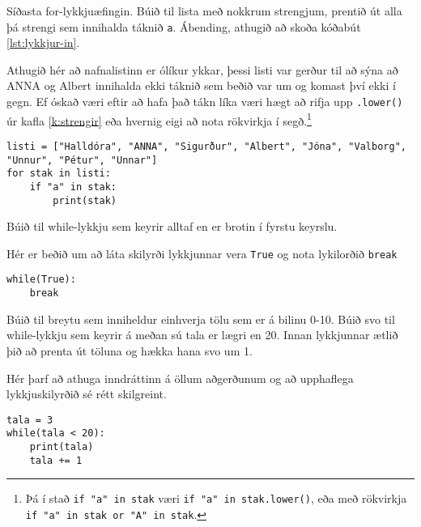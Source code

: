 \begin{exercise}\label{lyk5}
Síðasta for-lykkjuæfingin.
Búið til lista með nokkrum strengjum, prentið út alla þá strengi sem innihalda táknið \texttt{a}.
Ábending, athugið að skoða kóðabút \ref{lst:lykkjur-in}.
\end{exercise}
\begin{Answer}[ref={lyk5}]
Athugið hér að nafnalistinn er ólíkur ykkar, þessi listi var gerður til að sýna að ANNA og Albert innihalda ekki táknið sem beðið var um og komast því ekki í gegn.
Ef óskað væri eftir að hafa það tákn líka væri hægt að rifja upp \texttt{.lower()} úr kafla \ref{k:strengir} eða hvernig eigi að nota rökvirkja í segð.\footnote{Þá í stað \texttt{if "a" in stak} væri \texttt{if "a" in stak.lower()}, eða með rökvirkja \texttt{if "a" in stak or "A" in stak}.}
	
\begin{lstlisting}
listi = ["Halldóra", "ANNA", "Sigurður", "Albert", "Jóna", "Valborg", "Unnur", "Pétur", "Unnar"]
for stak in listi:
	if "a" in stak:
		print(stak)\end{lstlisting}
\end{Answer}

\begin{exercise}\label{lyk6}
Búið til while-lykkju sem keyrir alltaf en er brotin í fyrstu keyrslu.
\end{exercise}
\begin{Answer}[ref={lyk6}]
Hér er beðið um að láta skilyrði lykkjunnar vera \texttt{True} og nota lykilorðið \texttt{break}
	
\begin{lstlisting}
while(True):
	break\end{lstlisting}
\end{Answer}

\begin{exercise}\label{lyk7}
Búið til breytu sem inniheldur einhverja tölu sem er á bilinu 0-10.
Búið svo til while-lykkju sem keyrir á meðan sú tala er lægri en 20.
Innan lykkjunnar ætlið þið að prenta út töluna og hækka hana svo um 1.
\end{exercise}
\begin{Answer}[ref={lyk7}]
Hér þarf að athuga inndráttinn á öllum aðgerðunum og að upphaflega lykkjuskilyrðið sé rétt skilgreint.
\begin{lstlisting}
tala = 3
while(tala < 20):
	print(tala)
	tala += 1\end{lstlisting}
\end{Answer}

